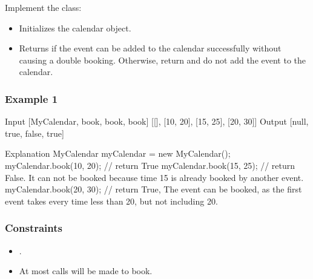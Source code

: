 \documentclass[letterpaper,12pt,english]{book}
\begin{document}
\sphinxAtStartPar
Implement the  class:
\begin{itemize}
\item {} 
\sphinxAtStartPar
{} Initializes the calendar object.

\item {} 
\sphinxAtStartPar
{} Returns  if the event can be added to the calendar successfully without causing a double booking. Otherwise, return  and do not add the event to the calendar.

\end{itemize}


\subsubsection{Example 1}
\label{\detokenize{Sorting/04_SORT_729_My_Calendar_I:example-1}}
\begin{sphinxVerbatim}[commandchars=\\\{\}]
Input
[\PYGZdq{}MyCalendar\PYGZdq{}, \PYGZdq{}book\PYGZdq{}, \PYGZdq{}book\PYGZdq{}, \PYGZdq{}book\PYGZdq{}]
[[], [10, 20], [15, 25], [20, 30]]
Output
[null, true, false, true]

Explanation
MyCalendar myCalendar = new MyCalendar();
myCalendar.book(10, 20); // return True
myCalendar.book(15, 25); // return False. It can not be booked because time 15 is already booked by another event.
myCalendar.book(20, 30); // return True, The event can be booked, as the first event takes every time less than 20, but not including 20.
\end{sphinxVerbatim}


\subsubsection{Constraints}
\label{\detokenize{Sorting/04_SORT_729_My_Calendar_I:constraints}}\begin{itemize}
\item {} 
\sphinxAtStartPar
{}.

\item {} 
\sphinxAtStartPar
At most  calls will be made to book.

\end{itemize}
\end{document}
